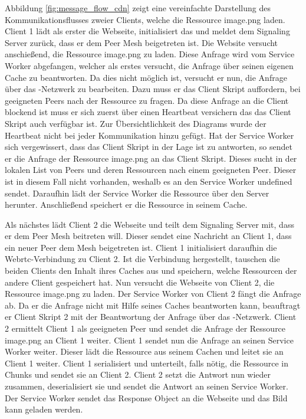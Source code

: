 Abbildung \ref{fig:message_flow_cdn} zeigt eine vereinfachte Darstellung des Kommunikationsflusses zweier Clients, welche die Ressource image.png laden. Client 1 lädt als erster die Webseite, initialisiert das \cdn und meldet dem Signaling Server zurück, dass er dem Peer Mesh beigetreten ist. Die Website versucht anschießend, die Ressource image.png zu laden. Diese Anfrage wird vom Service Worker abgefangen, welcher als erstes versucht, die Anfrage über seinen eigenen Cache zu beantworten. Da dies nicht möglich ist, versucht er nun, die Anfrage über das \pTp-Netzwerk zu bearbeiten. Dazu muss er das Client Skript auffordern, bei geeigneten Peers nach der Ressource zu fragen. Da diese Anfrage an die Client blockend ist muss er sich zuerst über einen Heartbeat versichern das das Client Skript auch verfügbar ist. Zur Übersichtlichkeit des Diagrams wurde der Heartbeat nicht bei jeder Kommunikation hinzu gefügt. Hat der Service Worker sich vergewissert, dass das Client Skript in der Lage ist zu antworten, so sendet er die Anfrage der Ressource image.png an das Client Skript. Dieses sucht in der lokalen List von Peers und deren Ressourcen nach einem geeigneten Peer. Dieser ist in diesem Fall nicht vorhanden, weshalb es an den Service Worker undefined sendet. Daraufhin lädt der Service Worker die Ressource über den Server herunter. Anschließend speichert er die Ressource in seinem Cache.

Als nächstes lädt Client 2 die Webseite und teilt dem Signaling Server mit, dass er dem Peer Mesh beitreten will. Dieser sendet eine Nachricht an Client 1, dass ein neuer Peer dem Mesh beigetreten ist. Client 1 initialisiert daraufhin die Webrtc-Verbindung zu Client 2. Ist die Verbindung hergestellt, tauschen die beiden Clients den Inhalt ihres Caches aus und speichern, welche Ressourcen der andere Client gespeichert hat. Nun versucht die Webseite von Client 2, die Ressource image.png zu laden. Der Service Worker von Client 2 fängt die Anfrage ab. Da er die Anfrage nicht mit Hilfe seines Caches beantworten kann, beauftragt er Client Skript 2 mit der Beantwortung der Anfrage über das \pTp-Netzwerk. Client 2 ermittelt Client 1 als geeigneten Peer und sendet die Anfrage der Ressource image.png an Client 1 weiter. Client 1 sendet nun die Anfrage an seinen Service Worker weiter. Dieser lädt die Ressource aus seinem Cachen und leitet sie an Client 1 weiter. Client 1 serialisiert und unterteilt, falls nötig, die Ressource in Chunks und sendet sie an Client 2. Client 2 setzt die Antwort nun wieder zusammen, deserialisiert sie und sendet die Antwort an seinen Service Worker. Der Service Worker sendet das Response Object an die Webseite und das Bild kann geladen werden.

